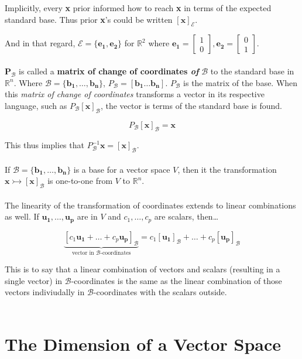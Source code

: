 \documentclass[12pt]{article}
\newcommand{\R}{\mathbb{R}}
\newcommand{\bt}[1]{\textbf{{#1}}}
\newcommand{\bm}[1]{\mathbf{{#1}}}
\newcommand{\mb}{\begin{bmatrix}}
\newcommand{\me}{\end{bmatrix}}
\newcommand{\mmc}[1]{\mathcal{{#1}}}
\newcommand{\set}[1]{\{{#1}\}}
\begin{document}
Implicitly, every \bt{x} prior informed how to reach \bt{x} in terms of the expected standard base. Thus prior \bt{x}'s could be written $[\bm{x}]_\mmc{E}$.

And in that regard, $\mmc{E} = \set{\bm{e_1, e_2}}$ for $\R^2$ where $\bm{e_1} = \mb 1 \\ 0 \me, \bm{e_2} = \mb 0 \\ 1 \me$. \\ \\

$\bm{P_\mmc{B}}$ is called a \bt{matrix of change of coordinates \emph{of}} $\bm{\mmc{B}}$ to the standard base in $\R^n$. Where $\mmc{B} = \set{\bm{b_1},\dots,\bm{b_n}}$, $P_\mmc{B} = [\bm{b_1} \dots \bm{b_n}]$.
$P_\mmc{B}$ is the matrix of the base. When this \emph{matrix of change of coordinates} transforms a vector in its respective language, such as $P_\mmc{B}[\bm{x}]_\mmc{B}$, the vector is terms of the standard base is found.

$$P_\mmc{B}[\bm{x}]_\mmc{B} = \bm{x}$$

This thus implies that $P_\mmc{B}^{-1}\bm{x} = [\bm{x}]_\mmc{B}$. \\ \\

If $\mmc{B} = \set{\bm{b_1},\dots,\bm{b_n}}$ is a base for a vector space $V$, then it the transformation $\bm{x} \rightarrowtail [\bm{x}]_\mmc{B}$ is one-to-one from $V$ to $\R^n$. \\ \\

The linearity of the transformation of coordinates extends to linear combinations as well. If $\bm{u_1}, \dots, \bm{u_p}$ are in $V$ and $c_1, \dots, c_p$ are scalars, then\dots

$$\underbrace{[c_1\bm{u_1} + \dots + c_p\bm{u_p}]_\mmc{B}}_{\textrm{vector in $\mmc{B}$-coordinates}} = c_1[\bm{u_1}]_\mmc{B} + \dots + c_p[\bm{u_p}]_\mmc{B}$$

This is to say that a linear combination of vectors and scalars (resulting in a single vector) in $\mmc{B}$-coordinates is the same as the
linear combination of those vectors indiviudally in $\mmc{B}$-coordinates with the scalars outside. \\ \\

\section*{The Dimension of a Vector Space}
\end{document}
